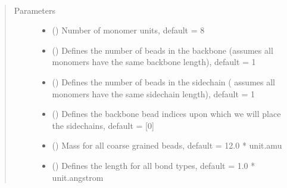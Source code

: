 \documentclass[letterpaper,12pt,english,openany,oneside]{sphinxmanual}
\begin{document}
\begin{fulllineitems}
\label{\detokenize{cg_model:cg_model.cgmodel.basic_cgmodel}}~\begin{quote}\begin{description}
\item[{Parameters}] \leavevmode\begin{itemize}
\item {} 
 () \textendash{} Number of monomer units, default = 8

\item {} 
 () \textendash{} Defines the number of beads in the backbone (assumes all monomers have the same backbone length), default = 1

\item {} 
 () \textendash{} Defines the number of beads in the sidechain ( assumes all monomers have the same sidechain length), default = 1

\item {} 
 (\sphinxstyleliteralemphasis{\sphinxupquote{( }}\sphinxstyleliteralemphasis{\sphinxupquote{ )}}) \textendash{} Defines the backbone bead indices upon which we will place the sidechains, default = {[}0{]}

\item {} 
 () \textendash{} Mass for all coarse grained beads, default = 12.0 * unit.amu

\item {} 
 () \textendash{} Defines the length for all bond types, default = 1.0 * unit.angstrom


\end{itemize}
\end{description}
\end{quote}
\end{fulllineitems}
\end{document}
